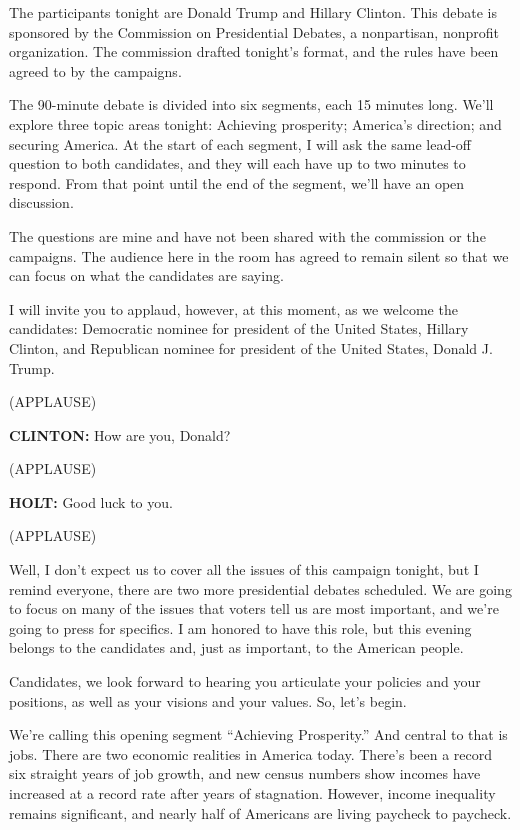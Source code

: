 The participants tonight are Donald Trump and Hillary Clinton. This
debate is sponsored by the Commission on Presidential Debates, a
nonpartisan, nonprofit organization. The commission drafted tonight's
format, and the rules have been agreed to by the campaigns.

The 90-minute debate is divided into six segments, each 15 minutes long.
We'll explore three topic areas tonight: Achieving prosperity; America's
direction; and securing America. At the start of each segment, I will
ask the same lead-off question to both candidates, and they will each
have up to two minutes to respond. From that point until the end of the
segment, we'll have an open discussion.

The questions are mine and have not been shared with the commission or
the campaigns. The audience here in the room has agreed to remain silent
so that we can focus on what the candidates are saying.

I will invite you to applaud, however, at this moment, as we welcome the
candidates: Democratic nominee for president of the United States,
Hillary Clinton, and Republican nominee for president of the United
States, Donald J. Trump.

(APPLAUSE)

\textbf{CLINTON:} How are you, Donald?

(APPLAUSE)

\textbf{HOLT:} Good luck to you.

(APPLAUSE)

Well, I don't expect us to cover all the issues of this campaign
tonight, but I remind everyone, there are two more presidential debates
scheduled. We are going to focus on many of the issues that voters tell
us are most important, and we're going to press for specifics. I am
honored to have this role, but this evening belongs to the candidates
and, just as important, to the American people.

Candidates, we look forward to hearing you articulate your policies and
your positions, as well as your visions and your values. So, let's
begin.

We're calling this opening segment ``Achieving Prosperity.'' And central
to that is jobs. There are two economic realities in America today.
There's been a record six straight years of job growth, and new census
numbers show incomes have increased at a record rate after years of
stagnation. However, income inequality remains significant, and nearly
half of Americans are living paycheck to paycheck.

